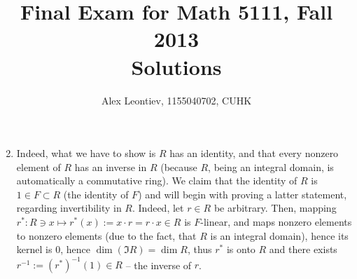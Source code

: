 \documentclass[8pt,fleqn]{article} %
\title{Final Exam for Math 5111, Fall 2013\\Solutions}
\author{Alex Leontiev, 1155040702, CUHK}
\begin{document}
\maketitle
\begin{enumerate}[label=\bfseries Problem \arabic*.]
	\setcounter{enumi}{1}
	\item Indeed, what we have to show is $R$ has an identity,
		and that every nonzero element of $R$ has an inverse in $R$ (because $R$, being an integral
		domain, is automatically a commutative ring). We claim that the identity of $R$ is $1\in F\subset R$ (the identity of $F$)
		and will begin with proving a latter statement, regarding invertibility in $R$. Indeed, let $r\in R$ be arbitrary. Then,
		mapping $r^*:
		R\ni x\mapsto r^*(x):=x\cdot r=r\cdot x\in R$ is $F$-linear, and maps nonzero elements to nonzero elements (due to the fact, that
		$R$ is an integral domain), hence its kernel is $0$, hence $\dim(\Im R)=\dim R$, thus $r^*$ is onto $R$ and there exists
		$r^{-1}:=(r^*)^{-1}(1)\in R$ -- the inverse of $r$.


\end{enumerate}
\end{document}
